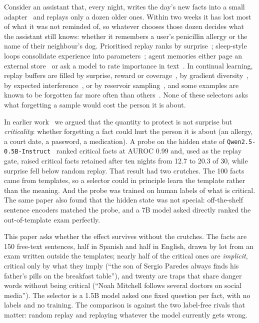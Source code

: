 \documentclass[11pt,a4paper]{article}
\begin{document}
Consider an assistant that, every night, writes the day's new facts into a small adapter~\cite{hu2021lora} and replays only a dozen older ones.
Within two weeks it has lost most of what it was not reminded of, so whatever chooses those dozen decides what the assistant still knows: whether it remembers a user's penicillin allergy or the name of their neighbour's dog.
Prioritised replay ranks by surprise~\cite{schaul2015per}; sleep-style loops consolidate experience into parameters~\cite{behrouz2026sleep,dennis2026nightly,han2026evaf}; agent memories either page an external store~\cite{packer2023memgpt} or ask a model to rate importance in text~\cite{park2023generative}.
In continual learning, replay buffers are filled by surprise, reward or coverage~\cite{isele2018selective}, by gradient diversity~\cite{aljundi2019gss}, by expected interference~\cite{aljundi2019mir}, or by reservoir sampling~\cite{rolnick2019er}, and some examples are known to be forgotten far more often than others~\cite{toneva2019forgetting}.
None of these selectors asks what forgetting a sample would cost the person it is about.

In earlier work~\cite{goin2026surprise} we argued that the quantity to protect is not surprise but \emph{criticality}: whether forgetting a fact could hurt the person it is about (an allergy, a court date, a password, a medication).
A probe on the hidden state of \texttt{Qwen2.5-0.5B-Instruct}~\cite{qwen2025} ranked critical facts at AUROC 0.99 and, used as the replay gate, raised critical facts retained after ten nights from 12.7 to 20.3 of 30, while surprise fell below random replay.
That result had two crutches.
The 100 facts came from templates, so a selector could in principle learn the template rather than the meaning.
And the probe was trained on human labels of what is critical.
The same paper also found that the hidden state was not special: off-the-shelf sentence encoders matched the probe, and a 7B model asked directly ranked the out-of-template exam perfectly.

This paper asks whether the effect survives without the crutches.
The facts are 150 free-text sentences, half in Spanish and half in English, drawn by lot from an exam written outside the templates; nearly half of the critical ones are \emph{implicit}, critical only by what they imply (``the son of Sergio Paredes always finds his father's pills on the breakfast table''), and twenty are traps that share danger words without being critical (``Noah Mitchell follows several doctors on social media'').
The selector is a 1.5B model asked one fixed question per fact, with no labels and no training.
The comparison is against the two label-free rivals that matter: random replay and replaying whatever the model currently gets wrong.
\end{document}
